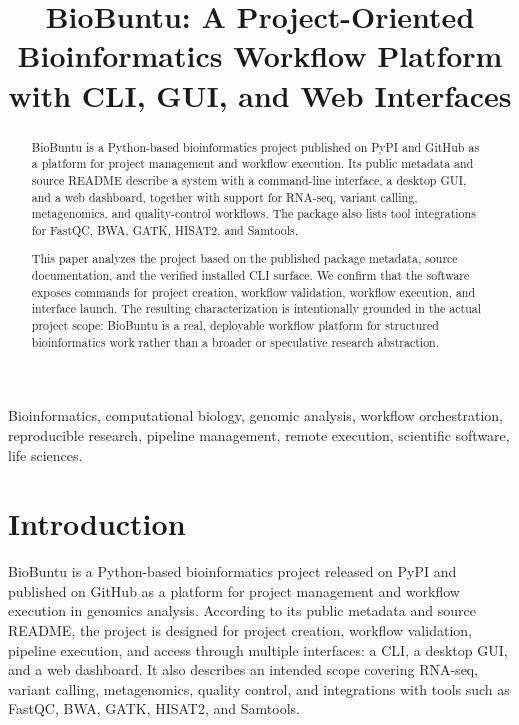 \documentclass[10pt,conference]{IEEEtran}
\begin{document}
\title{BioBuntu: A Project-Oriented Bioinformatics Workflow Platform with CLI, GUI, and Web Interfaces}

\author{
}

\maketitle

\begin{abstract}
BioBuntu is a Python-based bioinformatics project published on PyPI and GitHub as a platform for project management and workflow execution. Its public metadata and source README describe a system with a command-line interface, a desktop GUI, and a web dashboard, together with support for RNA-seq, variant calling, metagenomics, and quality-control workflows. The package also lists tool integrations for FastQC, BWA, GATK, HISAT2, and Samtools.

This paper analyzes the project based on the published package metadata, source documentation, and the verified installed CLI surface. We confirm that the software exposes commands for project creation, workflow validation, workflow execution, and interface launch. The resulting characterization is intentionally grounded in the actual project scope: BioBuntu is a real, deployable workflow platform for structured bioinformatics work rather than a broader or speculative research abstraction.
\end{abstract}

\begin{IEEEkeywords}
Bioinformatics, computational biology, genomic analysis, workflow orchestration, reproducible research, pipeline management, remote execution, scientific software, life sciences.
\end{IEEEkeywords}

\section{Introduction}

BioBuntu is a Python-based bioinformatics project released on PyPI and published on GitHub as a platform for project management and workflow execution in genomics analysis. According to its public metadata and source README, the project is designed for project creation, workflow validation, pipeline execution, and access through multiple interfaces: a CLI, a desktop GUI, and a web dashboard. It also describes an intended scope covering RNA-seq, variant calling, metagenomics, quality control, and integrations with tools such as FastQC, BWA, GATK, HISAT2, and Samtools.
\end{document}
